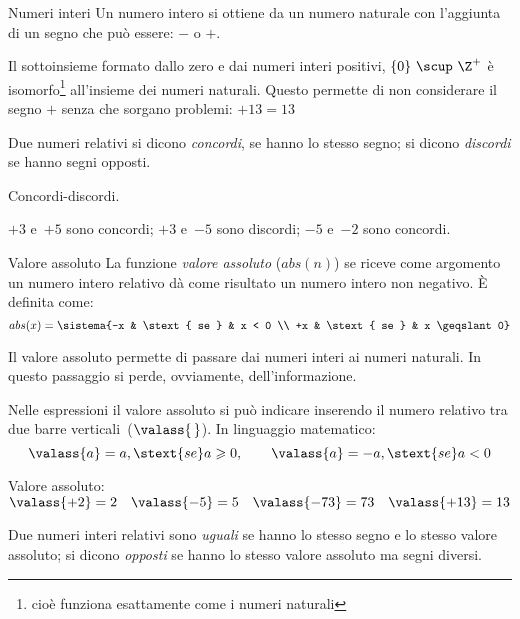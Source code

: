 \begin{definizione}{Numeri interi}{}
Un numero intero si ottiene da un numero naturale con l'aggiunta di un segno 
che può essere: \(-\) o \(+\).
\end{definizione}

\begin{osservazione}{}{}
Il sottoinsieme formato dallo zero e dai numeri interi positivi, 
\(\{0\} ~\scup~ \Z^+\) 
è isomorfo\footnote{
cioè funziona esattamente come i numeri naturali} 
all'insieme dei numeri naturali.
Questo permette di non considerare il segno \(+\) senza che sorgano 
problemi: \(+13 = 13\)
\end{osservazione}

\begin{definizione}{}{}
Due numeri relativi si dicono \emph{concordi}, se hanno lo stesso segno; 
si dicono \emph{discordi} se hanno segni opposti.
\end{definizione}

\begin{esempio}{}{}
Concordi-discordi.

\(+3\) e~\(+5\) sono concordi; \quad 
\(+3\) e~\(-5\) sono discordi; \quad 
\(-5\) e~\(-2\) sono concordi.
\end{esempio}

\begin{definizione}{Valore assoluto}{}
La funzione \emph{valore assoluto} (\(abs(n)\)) se riceve come argomento 
un numero intero relativo dà come risultato un numero intero non negativo.
È definita come:
\[abs(x) = 
\sistema{-x & \stext{ se } & x < 0 \\ +x & \stext{ se } & x \geqslant 0}\]
\end{definizione}

Il valore assoluto permette di passare dai numeri interi ai numeri naturali. 
In questo passaggio si perde, ovviamente, dell'informazione.

Nelle espressioni il valore assoluto si può indicare inserendo il numero 
relativo tra due barre verticali~(\(\valass{\,}\)). In linguaggio
matematico:
\[\valass{a}=a,\stext{ se }a\geqslant0,\qquad 
  \valass{a}=-a,\stext{ se }a<0\]

\begin{esempio}{}{}
Valore assoluto: \qquad
\(\valass{+2}=2 \quad \valass{-5}=5 \quad 
\valass{-73}=73 \quad \valass{+13}=13\)
\end{esempio}

\begin{definizione}{}{}
Due numeri interi relativi sono \emph{uguali} se hanno lo stesso segno e 
lo stesso valore assoluto;
si dicono \emph{opposti} se hanno lo stesso valore assoluto ma segni 
diversi.
\end{definizione}

